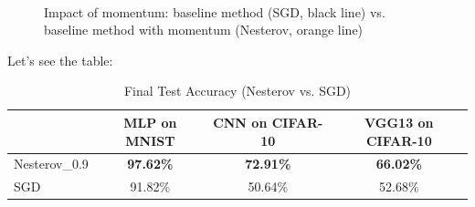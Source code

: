 \documentclass[12pt]{article}
\begin{document}
\begin{figure}[htbp]
     \\
     \quad
    \caption{Impact of momentum: baseline method (SGD, black line) vs. baseline method with momentum (Nesterov, orange line)}
    \label{fig:momentum_study}
\end{figure}

Let's see the table:

\begin{table}[H]
\centering
\caption{Final Test Accuracy (Nesterov vs. SGD)}
\label{tab:nesterov_vs_sgd}
\begin{tabular}{|l|c|c|c|}
\hline
             & MLP on MNIST & CNN on CIFAR-10 & VGG13 on CIFAR-10 \\ \hline
Nesterov\_0.9 & \textbf{97.62\%} & \textbf{72.91\%}  & \textbf{66.02\%}    \\ \hline
SGD          & 91.82\%      & 50.64\%         & 52.68\%           \\ \hline
\end{tabular}
\end{table}
\end{document}
